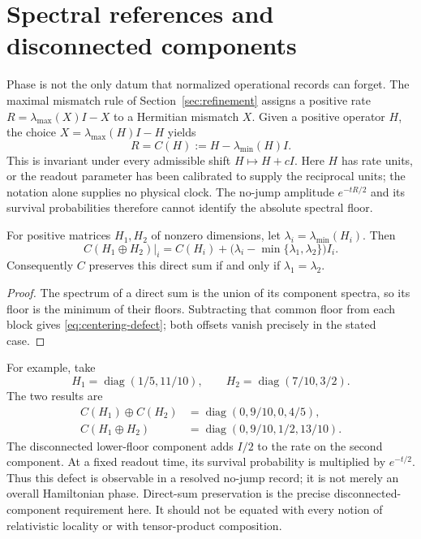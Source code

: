 \section{Spectral references and disconnected components}
\label{sec:spectral}

Phase is not the only datum that normalized operational records can forget.
The maximal mismatch rule of Section~\ref{sec:refinement} assigns a positive rate
$R=\lambda_{\max}(X)I-X$ to a Hermitian mismatch $X$.
Given a positive operator $H$, the choice $X=\lambda_{\max}(H)I-H$ yields
\begin{equation}
 R=C(H):=H-\lambda_{\min}(H)I.
 \label{eq:centering}
\end{equation}
This is invariant under every admissible shift $H\mapsto H+cI$.
Here $H$ has rate units, or the readout parameter has been calibrated to supply
the reciprocal units; the notation alone supplies no physical clock.
The no-jump amplitude $e^{-tR/2}$ and its survival probabilities therefore cannot
identify the absolute spectral floor.

\begin{proposition}
\label{prop:centering}
For positive matrices $H_1,H_2$ of nonzero dimensions, let
$\lambda_i=\lambda_{\min}(H_i)$.
Then
\begin{equation}
 C(H_1\oplus H_2)|_i
 =C(H_i)+\bigl(\lambda_i-\min\{\lambda_1,\lambda_2\}\bigr)I_i.
 \label{eq:centering-defect}
\end{equation}
Consequently $C$ preserves this direct sum if and only if
$\lambda_1=\lambda_2$.
\end{proposition}
\begin{proof}
The spectrum of a direct sum is the union of its component spectra, so its
floor is the minimum of their floors.
Subtracting that common floor from each block gives
\eqref{eq:centering-defect}; both offsets vanish precisely in the stated case.
\end{proof}

For example, take
\begin{equation}
 H_1=\operatorname{diag}(1/5,11/10),\qquad
 H_2=\operatorname{diag}(7/10,3/2).
\end{equation}
The two results are
\begin{align}
 C(H_1)\oplus C(H_2)&=\operatorname{diag}(0,9/10,0,4/5),\nonumber\\
 C(H_1\oplus H_2)&=\operatorname{diag}(0,9/10,1/2,13/10).
\end{align}
The disconnected lower-floor component adds $I/2$ to the rate on the second
component.
At a fixed readout time, its survival probability is multiplied by $e^{-t/2}$.
Thus this defect is observable in a resolved no-jump record; it is not merely
an overall Hamiltonian phase.
Direct-sum preservation is the precise disconnected-component requirement here.
It should not be equated with every notion of relativistic locality or with
tensor-product composition.

